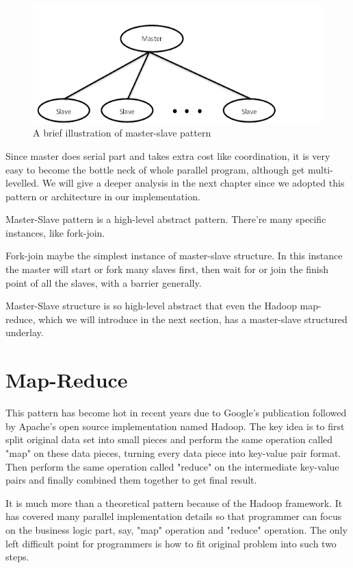 \documentclass[12pt,a4paper]{report}
\begin{document}
\begin{figure}[ht]
\centering
\includegraphics[width=120mm]{master-slave-brief.png}
\caption{A brief illustration of master-slave pattern}
\end{figure}

Since master does serial part and takes extra cost like coordination, it is very easy to become the bottle neck of whole parallel program, although get multi-levelled. We will give a deeper analysis in the next chapter since we adopted this pattern or architecture in our implementation.

Master-Slave pattern is a high-level abstract pattern. There're many specific instances, like fork-join. 

Fork-join maybe the simplest instance of master-slave structure. In this instance the master will start or fork many slaves first, then wait for or join the finish point of all the slaves, with a barrier generally.

Master-Slave structure is so high-level abstract that even the Hadoop map-reduce, which we will introduce in the next section, has a master-slave structured underlay.

\section{Map-Reduce}

This pattern has become hot in recent years due to Google's publication \cite{google-map-reduce} followed by Apache's open source implementation named Hadoop. The key idea is to first split original data set into small pieces and perform the same operation called "map" on these data pieces, turning every data piece into key-value pair format. Then perform the same operation called "reduce" on the intermediate key-value pairs and finally combined them together to get final result.

It is much more than a theoretical pattern because of the Hadoop framework. It has covered many parallel implementation details so that programmer can focus on the business logic part, say, "map" operation and "reduce" operation. The only left difficult point for programmers is how to fit original problem into such two steps.
\end{document}
